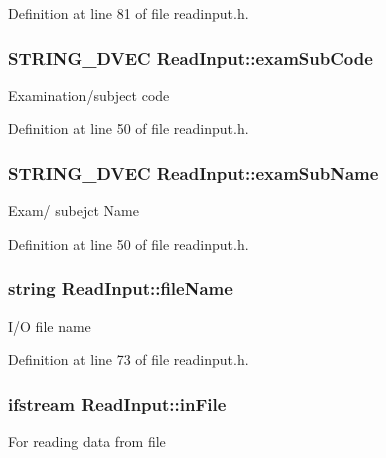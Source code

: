 Definition at line 81 of file readinput.\-h.

\hypertarget{classReadInput_a81eee5f7478e5d2d76afad814a6c4e3e}{
\subsubsection[{exam\-Sub\-Code}]{\setlength{\rightskip}{0pt plus 5cm}S\-T\-R\-I\-N\-G\-\_\-D\-V\-E\-C Read\-Input\-::exam\-Sub\-Code\hspace{0.3cm}{\ttfamily [protected]}}}\label{classReadInput_a81eee5f7478e5d2d76afad814a6c4e3e}
Examination/subject code 

Definition at line 50 of file readinput.\-h.

\hypertarget{classReadInput_a6ac62618d1b89d823230ae93c7b85c3b}{
\subsubsection[{exam\-Sub\-Name}]{\setlength{\rightskip}{0pt plus 5cm}S\-T\-R\-I\-N\-G\-\_\-D\-V\-E\-C Read\-Input\-::exam\-Sub\-Name\hspace{0.3cm}{\ttfamily [protected]}}}\label{classReadInput_a6ac62618d1b89d823230ae93c7b85c3b}
Exam/ subejct Name 

Definition at line 50 of file readinput.\-h.

\hypertarget{classReadInput_a834acf783052b5b2f129644b4accaadc}{
\subsubsection[{file\-Name}]{\setlength{\rightskip}{0pt plus 5cm}string Read\-Input\-::file\-Name\hspace{0.3cm}{\ttfamily [protected]}}}\label{classReadInput_a834acf783052b5b2f129644b4accaadc}
I/\-O file name 

Definition at line 73 of file readinput.\-h.

\hypertarget{classReadInput_afe0f493fcb2da1f644445501823fd0e2}{
\subsubsection[{in\-File}]{\setlength{\rightskip}{0pt plus 5cm}ifstream Read\-Input\-::in\-File\hspace{0.3cm}{\ttfamily [protected]}}}\label{classReadInput_afe0f493fcb2da1f644445501823fd0e2}
For reading data from file 

